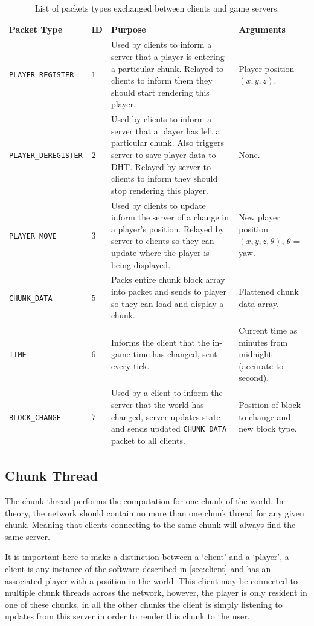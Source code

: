 \documentclass[12pt,notitlepage,a4paper]{report}
\begin{document}
	\begin{table}[!ht]
		\begin{tabularx}{\textwidth}{| l | l | X | p{2cm} |}
			\hline
			\bf Packet Type & \bf ID & \bf Purpose & \bf Arguments \\
			\hline
			\tt PLAYER\_REGISTER & $1$ & Used by clients to inform a server that a player is entering a particular chunk. Relayed to clients to inform them they should start rendering this player. & Player position $(x,y,z)$. \\
			\hline
			\tt PLAYER\_DEREGISTER & $2$ & Used by clients to inform a server that a player has left a particular chunk. Also triggers server to save player data to DHT. Relayed by server to clients to inform they should stop rendering this player. & None. \\
			\hline
			\tt PLAYER\_MOVE & $3$ & Used by clients to update inform the server of a change in a player's position. Relayed by server to clients so they can update where the player is being displayed. & New player position $(x,y,z,\theta)$, $\theta=$ yaw. \\
			\hline
			\tt CHUNK\_DATA & $5$ & Packs entire chunk block array into packet and sends to player so they can load and display a chunk. & Flattened chunk data array. \\
			\hline
			\tt TIME & $6$ & Informs the client that the in-game time has changed, sent every tick. & Current time as minutes from midnight (accurate to second). \\
			\hline
			\tt BLOCK\_CHANGE & $7$ & Used by a client to inform the server that the world has changed, server updates state and sends updated \texttt{CHUNK\_DATA} packet to all clients. & Position of block to change and new block type. \\
			\hline
		\end{tabularx}
		\caption{List of packets types exchanged between clients and game servers.}
		\label{tab:gamepackets}
	\end{table}
	
	\subsection{Chunk Thread}
	\label{sec:cthread}
	The chunk thread performs the computation for one chunk of the world. In theory, the network should contain no more than one chunk thread for any given chunk. Meaning that clients connecting to the same chunk will always find the same server.
	
	It is important here to make a distinction between a `client' and a `player', a client is any instance of the software described in \cref{sec:client} and has an associated player with a position in the world. This client may be connected to multiple chunk threads across the network, however, the player is only resident in one of these chunks, in all the other chunks the client is simply listening to updates from this server in order to render this chunk to the user.
	
\end{document}
